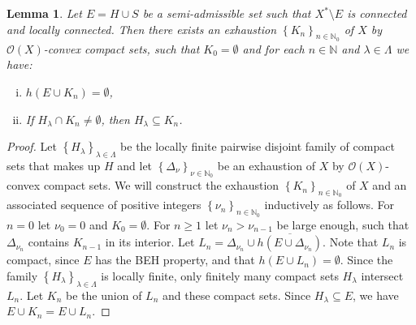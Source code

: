\documentclass[a4paper,11pt]{amsart}
\newcommand{\N}{\mathbb N}
\newcommand{\set}[1]{\left\{#1\right\}}
\newtheorem{lemma}{Lemma}
\begin{document}
\begin{lemma}\label{izcrpanje}
    Let $E = H \cup S$ be a semi-admissible set such that $X^* \setminus E$ is connected and locally connected.
    Then there exists an exhaustion $\set{K_n}_{n \in \N_0}$ of $X$ by $\mathcal{O}(X)$-convex compact sets, 
    such that $K_0 = \emptyset$ and for each $n \in \N$ and $\lambda \in \Lambda$ we have:
    \begin{enumerate}[(i)]
        \item $h(E \cup K_n) = \emptyset$,
        \item If $H_\lambda \cap K_n \neq \emptyset$, then $H_\lambda \subseteq K_n$.
    \end{enumerate}
\end{lemma}

\begin{proof}
    Let $\set{H_\lambda}_{\lambda \in \Lambda}$ be the locally finite pairwise disjoint family of compact sets that makes up $H$ 
    and let $\set{\Delta_\nu}_{\nu \in \N_0}$ be an exhaustion of $X$ by $\mathcal{O}(X)$-convex compact sets. 
    We will construct the exhaustion $\set{K_n}_{n \in \N_0}$ of $X$ and an associated sequence of positive integers $\set{\nu_n}_{n \in \N_0}$ inductively as follows.
    For $n = 0$ let $\nu_0 = 0$ and $K_0 = \emptyset$.
    For $n \ge 1$ let $\nu_n > \nu_{n-1}$ be large enough, such that $\Delta_{\nu_n}$ contains $K_{n-1}$ in its interior.
    Let $L_n = \Delta_{\nu_n} \cup \overline{h(E \cup \Delta_{\nu_n})}$. Note that $L_n$ is compact, since $E$ has the BEH property, and that $h(E \cup L_n) = \emptyset$.
    Since the family $\set{H_\lambda}_{\lambda \in \Lambda}$ is locally finite, 
    only finitely many compact sets $H_\lambda$ intersect $L_n$. Let $K_n$ be the union of $L_n$ and these compact sets.
    Since $H_\lambda \subseteq E$, we have $E \cup K_n = E \cup L_n$.
    

\end{proof}
\end{document}
